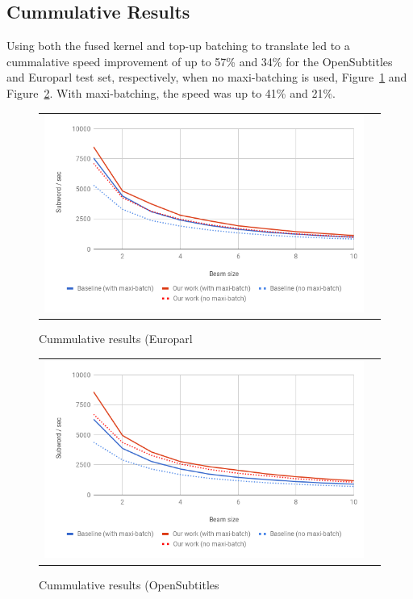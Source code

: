 \documentclass[11pt,a4paper]{article}
\begin{document}
\subsection{Cummulative Results}

Using both the fused kernel and top-up batching to translate led to a cummalative speed improvement of up to 57\% and 34\% for the OpenSubtitles and Europarl test set, respectively, when no maxi-batching is used, Figure~\ref{fig:cummulative-europarl} and Figure~\ref{fig:cummulative-opensubtitles}. With maxi-batching, the speed was up to 41\% and 21\%.

\begin{figure}
\centering
\begin{tabular}{cc}
{\includegraphics[scale=0.3]{cummulative-europarl.png}} 
\end{tabular}
\caption{Cummulative results (Europarl}
\label{fig:cummulative-europarl}
\end{figure} 

\begin{figure}
\centering
\begin{tabular}{cc}
{\includegraphics[scale=0.3]{cummulative-opensubtitles.png}} 
\end{tabular}
\caption{Cummulative results (OpenSubtitles}
\label{fig:cummulative-opensubtitles}
\end{figure} 
\end{document}

